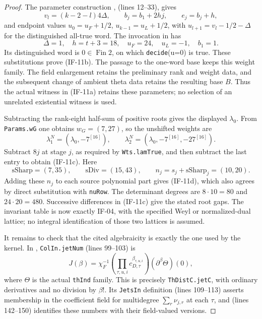 \documentclass[11pt,a4paper]{article}
\theoremstyle{definition}
\theoremstyle{remark}
\begin{document}
\begin{proof}
The parameter construction
,
 (lines 12--33), gives
\[
 v_l=(k-2-l)4\Delta,\qquad
 b_j=b_1+2hj,\qquad e_j=b_j+h,
\]
and endpoint values $u_0=u_F+1/2$, $u_{k-1}=u_L+1/2$, with
$u_{l+1}=v_l-1/2-\Delta$ for the distinguished all-true word.
The invocation in  has
\[
 \Delta=1,\quad h=t+3=18,\quad u_F=24,\quad u_L=-1,
 \quad b_1=1.
\]
Its distinguished word is $0\in\operatorname{Fin}2$, on which
\texttt{decide}(u=0) is true. These substitutions prove (IF-11b).
The passage to the one-word base keeps this weight family. The field
enlargement retains the preliminary rank and weight data, and the
subsequent change of ambient theta data retains the resulting base $B$. Thus the actual witness in (IF-11a) retains these
parameters; no selection of an unrelated existential witness is used.

Subtracting the rank-eight half-sum of positive roots gives the
displayed $\lambda_0$. From \texttt{Params.wG} one obtains
$w_G=(7,27)$, so the unshifted weights are
\[
 \lambda^N_1=(\lambda_0,-7^{[16]}),\qquad
 \lambda^N_2=(\lambda_0,-7^{[16]},-27^{[16]}).
\]
Subtract $8j$ at stage $j$, as required by
\texttt{Wts.lamTrue}, and then subtract the last entry to obtain
(IF-11c). Here
\[
 \mathrm{sSharp}=(7,35),\qquad
 \mathrm{sDiv}=(15,43),\qquad
 n_j=s_j+\mathrm{sSharp}_j=(10,20).
\]
Adding these $n_j$ to each source polynomial part gives (IF-11d),
which also agrees by direct substitution with \texttt{nuRow}.
The determinant degrees are $8\cdot10=80$ and $24\cdot20=480$.
Successive differences in (IF-11c) give the stated root gaps.
The invariant table is now exactly IF-04, with the specified Weyl
or normalized-dual lattice; no integral identification of those two
lattices is assumed.

It remains to check that the cited algebraicity is exactly the one
used by the kernel. In
,
\texttt{ColIn.jetNum} (lines 99--103) is
\[
 J(\beta)=\chi_F^{-1}
       \left(\prod_{\tau,u,i}c_{D,\tau}^{\beta_{\tau,u,i}}\right)
       (\partial^\beta\Theta)(0),                 \tag{IF-11f}
\]
where $\Theta$ is the actual \texttt{thInd} family. This is precisely
\texttt{ThDistC.jetC}, with ordinary derivatives and no division by
$\beta!$. Its \texttt{JetsIn} definition (lines 109--113) asserts
membership in the coefficient field for multidegree
$\sum_r\nu_{j,r}$ at each $\tau$, and
 (lines 142--150) identifies
these numbers with their field-valued versions.


\end{proof}
\end{document}

